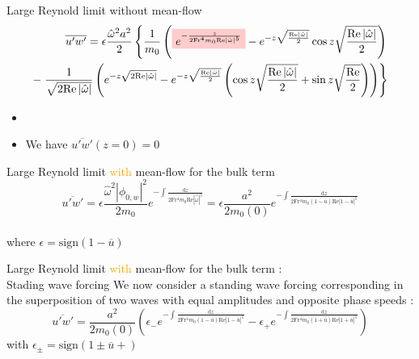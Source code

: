 \documentclass[10pt]{beamer}
\newcommand{\NodeFill}[3]{\tikz[baseline]{\node[fill=#1!20,anchor=base](#2){#3};}}
\begin{document}
\begin{frame}{Large Reynold limit without mean\--flow}
	\begin{align*}
		\overline{u'w'}=\epsilon\frac{\hat{\omega}^{2}a^{2}}{2}\left\{\frac{1}{m_{0}}\left( \NodeFill{red}{}{$e^{-\frac{z}{2\mathrm{Fr^{4}}m_{0}\mathrm{Re}\left\lvert\hat{\omega}\right\rvert^{5}}}$}-e^{-z\sqrt{\frac{\mathrm{Re}\left\lvert\hat{\omega}\right\rvert}{2}}}\cos{z\sqrt{\frac{\mathrm{Re}\left\lvert\hat{\omega}\right\rvert}{2}}} \right)\right.\\
		-\left.\frac{1}{\sqrt{\mathrm{2Re}\left\lvert\hat{\omega}\right\rvert}} \left(e^{-z\sqrt{2\mathrm{Re}\left\lvert\hat{\omega}\right\rvert}}-e^{-z\sqrt{\frac{\mathrm{Re}\left\lvert\hat{\omega}\right\rvert}{2}}} \left(\cos{z\sqrt{\frac{\mathrm{Re}\left\lvert\hat{\omega}\right\rvert}{2}}}+\sin{z\sqrt{\frac{\mathrm{Re}}{2}}} \right) \right)\right\}
	\end{align*}
	\begin{itemize}
		\item \NodeFill{red}{}{Bulk streaming}
		\item We have $\overline{u'w'}\left(z=0\right)=0$
	\end{itemize}
\end{frame}

\begin{frame}{Large Reynold limit \textcolor{orange}{with} mean\--flow for the bulk term}
	\begin{equation*}
		\overline{u'w'}=\epsilon\frac{\hat{\omega}^{2}\left\lvert \phi_{0,w} \right\rvert^{2}}{2m_{0}}e^{-\int \frac{\mathrm{d}z}{2\mathrm{Fr^{4}}m_{0}\mathrm{Re}\left\lvert\hat{\omega}\right\rvert^{5}}}=\epsilon\frac{a^{2}}{2m_{0}\left(0\right)}e^{-\int \frac{\mathrm{d}z}{2\mathrm{Fr^{4}}m_{0}\left(1-\overline{u}\right)\mathrm{Re}\left\lvert1-\overline{u}\right\rvert^{5}}}
	\end{equation*}	\\
	where $\epsilon=\mathrm{sign}\left(1-\overline{u}\right)$
\end{frame}

\begin{frame}{Large Reynold limit \textcolor{orange}{with} mean\--flow for the bulk term : \\ Stading wave forcing}
	We now consider a standing wave forcing corresponding in the superposition of two waves with equal amplitudes and opposite phase speeds :
	\begin{equation*}\!\!\!\!\!\!\!\!\!
		\overline{u'w'}=\frac{a^{2}}{2m_{0}\left(0\right)}\left(\epsilon_{-}e^{-\int \frac{\mathrm{d}z}{2\mathrm{Fr^{4}}m_{0}\left(1-\overline{u}\right)\mathrm{Re}\left\lvert1-\overline{u}\right\rvert^{5}}}-\epsilon_{+}e^{-\int \frac{\mathrm{d}z}{2\mathrm{Fr^{4}}m_{0}\left(1+\overline{u}\right)\mathrm{Re}\left\lvert1+\overline{u}\right\rvert^{5}}} \right)
	\end{equation*}	with $\epsilon_{\pm}=\mathrm{sign}\left(1\pm\overline{u}+\right)$
\end{frame}
\end{document}
